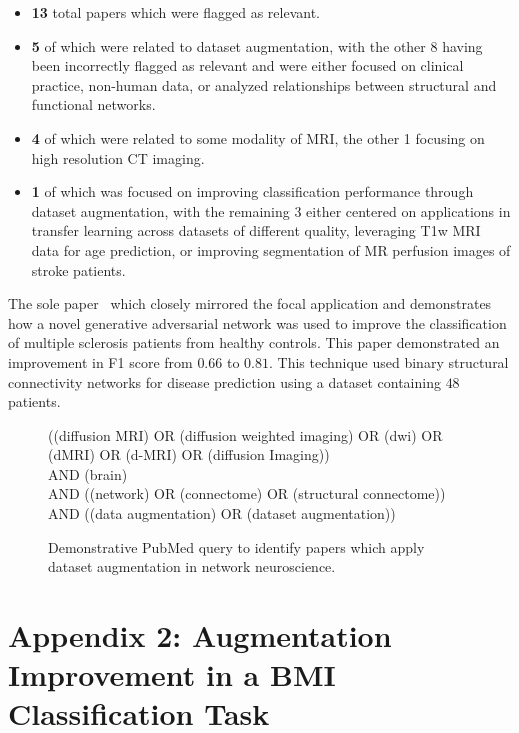 \documentclass[num-refs]{nbdt-article}
\begin{document}
\begin{itemize}
\item \textbf{13} total papers which were flagged as relevant.
\item \textbf{5} of which were related to dataset augmentation, with the other 8 having been incorrectly flagged as relevant and were either focused on clinical practice, non-human data, or analyzed relationships between structural and functional networks.
\item \textbf{4} of which were related to some modality of MRI, the other 1 focusing on high resolution CT imaging.
\item \textbf{1} of which was focused on improving classification performance through dataset augmentation, with the remaining 3 either centered on applications in transfer learning across datasets of different quality, leveraging T1w MRI data for age prediction, or improving segmentation of MR perfusion images of stroke patients.
\end{itemize}

The sole paper~\cite{barile2021data} which closely mirrored the focal application and demonstrates how a novel generative adversarial network was used to improve the classification of multiple sclerosis patients from healthy controls. This paper demonstrated an improvement in F1 score from $0.66$ to $0.81$. This technique used binary structural connectivity networks for disease prediction using a dataset containing $48$ patients.

\begin{figure}[h!]
\begin{tcolorbox}\centering
((diffusion MRI) OR (diffusion weighted imaging) OR (dwi) OR (dMRI) OR (d-MRI) OR (diffusion Imaging))\\
AND (brain)\\
AND ((network) OR (connectome) OR (structural connectome))\\
AND ((data augmentation) OR (dataset augmentation))
\end{tcolorbox}
\caption{Demonstrative PubMed query to identify papers which apply dataset augmentation in network neuroscience.}
\label{pubmedquery}
\end{figure}

\clearpage
\onecolumn
\section*{Appendix 2: Augmentation Improvement in a BMI Classification Task}
\end{document}
